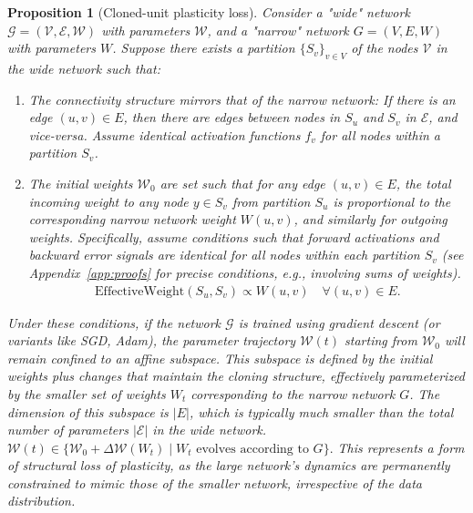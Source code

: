 \documentclass{article}
\newtheorem{proposition}{Proposition}[section]
\begin{document}
\begin{proposition}[Cloned-unit plasticity loss]
\label{prop:cloned}
Consider a "wide" network $\mathcal{G}=(\mathcal{V},\mathcal{E},\mathcal{W})$ with parameters $\mathcal{W}$, and a "narrow" network $G=(V,E,W)$ with parameters $W$. Suppose there exists a partition $\{S_v\}_{v\in V}$ of the nodes $\mathcal{V}$ in the wide network such that:
\begin{enumerate}
    \item The connectivity structure mirrors that of the narrow network: If there is an edge $(u,v) \in E$, then there are edges between nodes in $S_u$ and $S_v$ in $\mathcal{E}$, and vice-versa. Assume identical activation functions $f_v$ for all nodes within a partition $S_v$.
    \item The initial weights $\mathcal{W}_0$ are set such that for any edge $(u,v) \in E$, the total incoming weight to any node $y \in S_v$ from partition $S_u$ is proportional to the corresponding narrow network weight $W(u,v)$, and similarly for outgoing weights. Specifically, assume conditions such that forward activations and backward error signals are identical for all nodes within each partition $S_v$ (see Appendix~\ref{app:proofs} for precise conditions, e.g., involving sums of weights).
    \begin{align}
    \text{EffectiveWeight}(S_u, S_v) \propto W(u,v) \quad \forall (u,v) \in E.
    \end{align}
\end{enumerate}
Under these conditions, if the network $\mathcal{G}$ is trained using gradient descent (or variants like SGD, Adam), the parameter trajectory $\mathcal{W}(t)$ starting from $\mathcal{W}_0$ will remain confined to an affine subspace. This subspace is defined by the initial weights plus changes that maintain the cloning structure, effectively parameterized by the smaller set of weights $W_t$ corresponding to the narrow network $G$. The dimension of this subspace is $|E|$, which is typically much smaller than the total number of parameters $|\mathcal{E}|$ in the wide network.
\(
\mathcal{W}(t) \in \{\mathcal{W}_0 + \Delta\mathcal{W}(W_t) \mid W_t \text{ evolves according to } G \}.
\)
This represents a form of \emph{structural} loss of plasticity, as the large network's dynamics are permanently constrained to mimic those of the smaller network, irrespective of the data distribution.
\end{proposition}
\end{document}
